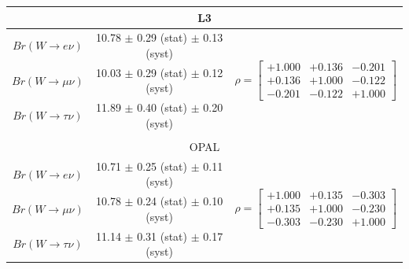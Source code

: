 \begin{table}[ht]
\begin{tabular}{ |c| c  c | }
         
         \hline
         \multicolumn{3}{|c|}{L3 \cite{Achard:2004zw}} \\
         \hline
         $Br(W\to e    \nu)$    & 10.78 $\pm$ 0.29 (stat) $\pm$ 0.13 (syst) & 
         \multirow{3}{*}{
            \begin{footnotesize}
            $\rho = \begin{bmatrix}
                +1.000 &+0.136 &-0.201 \\ 
                +0.136 &+1.000 &-0.122 \\
                -0.201 &-0.122 &+1.000 
            \end{bmatrix}$ 
            \end{footnotesize} 
         } \\
         $Br(W\to \mu  \nu)$    & 10.03 $\pm$ 0.29 (stat) $\pm$ 0.12 (syst) & \\ 
         $Br(W\to \tau \nu)$    & 11.89 $\pm$ 0.40 (stat) $\pm$ 0.20 (syst) & \\
         \hline
         
         \multicolumn{3}{c}{} \\
         
         \hline
         \multicolumn{3}{|c|}{OPAL \cite{Abbiendi:2007rs}} \\
         \hline
         $Br(W\to e    \nu)$    & 10.71 $\pm$ 0.25 (stat) $\pm$ 0.11 (syst) & 
         \multirow{3}{*}{
            \begin{footnotesize}
            $\rho = \begin{bmatrix}
                +1.000 &+0.135 &-0.303 \\ 
                +0.135 &+1.000 &-0.230 \\
                -0.303 &-0.230 &+1.000 
            \end{bmatrix}$ 
            \end{footnotesize} 
         } \\
         $Br(W\to \mu  \nu)$    & 10.78 $\pm$ 0.24 (stat) $\pm$ 0.10 (syst) & \\ 
         $Br(W\to \tau \nu)$    & 11.14 $\pm$ 0.31 (stat) $\pm$ 0.17 (syst) & \\
         \hline
         

\end{tabular}
\end{table}
